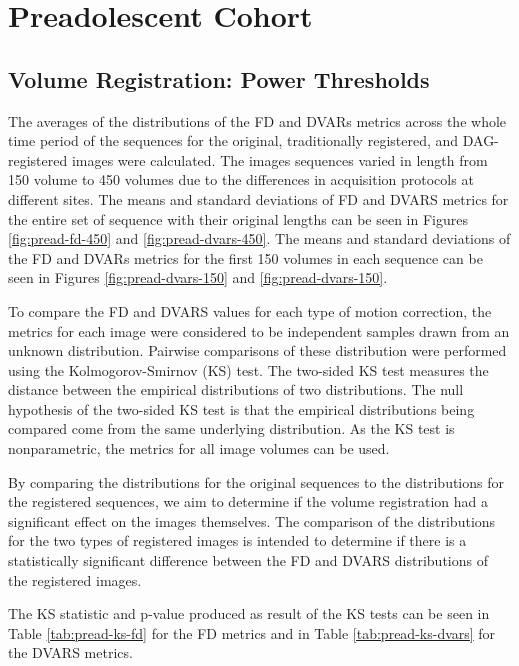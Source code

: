 \section{Preadolescent Cohort}

\subsection{Volume Registration: Power Thresholds}

The averages of the distributions of the FD and DVARs metrics across the whole time period of the sequences for the original, traditionally registered, and DAG-registered images were calculated. The images sequences varied in length from 150 volume to 450 volumes due to the differences in acquisition protocols at different sites. The means and standard deviations of FD and DVARS metrics for the entire set of sequence with their original lengths can be seen in Figures \ref{fig:pread-fd-450} and \ref{fig:pread-dvars-450}. The means and standard deviations of the FD and DVARs metrics for the first 150 volumes in each sequence can be seen in Figures \ref{fig:pread-dvars-150} and \ref{fig:pread-dvars-150}. 


To compare the FD and DVARS values for each type of motion correction, the metrics for each image were considered to be independent samples drawn from an unknown distribution. Pairwise comparisons of these distribution were performed using the Kolmogorov-Smirnov (KS) test. The two-sided KS test measures the distance between the empirical distributions of two distributions. The null hypothesis of the two-sided KS test is that the empirical distributions being compared come from the same underlying distribution. As the KS test is nonparametric, the metrics for all image volumes can be used.

By comparing the distributions for the original sequences to the distributions for the registered sequences, we aim to determine if the volume registration had a significant effect on the images themselves. The comparison of the distributions for the two types of registered images is intended to determine if there is a statistically significant difference between the FD and DVARS distributions of the registered images.


The KS statistic and p-value produced as result of the KS tests can be seen in Table \ref{tab:pread-ks-fd} for the FD metrics and in Table \ref{tab:pread-ks-dvars} for the DVARS metrics.





